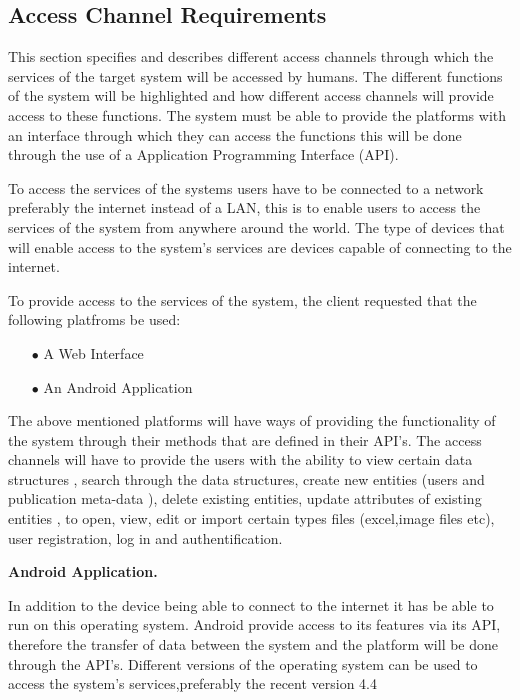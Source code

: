 \documentclass[a4paper,12pt]{article}
\begin{document}
\subsection{Access Channel Requirements}
\begin{flushleft}

This section specifies and describes different access channels through which the services of the target system will be accessed by humans. The different functions of the system will be highlighted and how different access channels will provide access to these functions. The system must be able to provide the platforms with an interface through which they can access the functions this will be done through the use of a Application Programming  Interface (API).

To access the services of the systems users have to be connected to a network preferably the internet instead of a LAN, this is to enable users to access the services of the system from anywhere around the world. The type of devices that will enable access to the system's services are devices capable of connecting to the internet.

To provide access to the services of the system, the client requested that the following platfroms
be used:

\begin{itemize}
\item[$\bullet$]A Web Interface
\item[$\bullet$]An Android Application
\\
\end{itemize}
 
The above mentioned platforms will have ways of providing the functionality of the system through their methods that are defined in their API's. The access channels will have to provide the users with the ability to view certain data structures , search through the data structures, create new entities (users and publication meta-data ), delete existing entities, update attributes of existing entities , to open, view, edit or import certain types files (excel,image files etc), user registration, log in and authentification. 

\textbf{Android Application.}

In addition to the device being able to connect to the internet it has be able to run on this operating system. Android provide access to its features via its API, therefore the transfer of data between the system and the platform will be done through the API's. Different versions of the operating system can be used to access the system's services,preferably the recent version 4.4


\end{flushleft}
\end{document}
